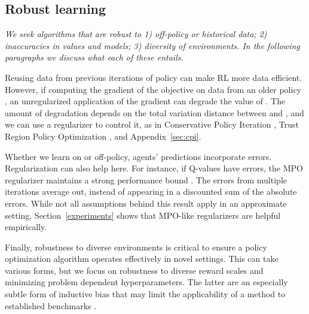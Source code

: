 \documentclass{article}
\begin{document}
\subsection{Robust learning}\label{sec:desire_robust} \textit{We seek algorithms that are robust to 1) off-policy or historical data; 2) inaccuracies in values and models; 3) diversity of environments. In the following paragraphs we discuss what each of these entails.}

Reusing data from previous iterations of policy  \citep{lin1992,riedmiller2005,mnih2015} can make RL more data efficient. However, if computing the gradient of the objective  on data from an older policy , an unregularized application of the gradient can degrade the value of . The amount of degradation depends on the total variation distance between  and , and we can use a regularizer to control it, as in Conservative Policy Iteration \cite{kakade2002approximately}, Trust Region Policy Optimization \cite{schulman2015trust}, and Appendix~\ref{sec:cpi}.

Whether we learn on or off-policy, agents' predictions incorporate errors. Regularization can also help here. For instance, if Q-values have errors, the MPO regularizer  maintains a strong performance bound \citep{vieillard2020}. The errors from multiple iterations average out, instead of appearing in a discounted sum of the absolute errors. While not all assumptions behind this result apply in an approximate setting, Section~\ref{experiments} shows that MPO-like regularizers are helpful empirically.

Finally, robustness to diverse environments is critical to ensure a policy optimization algorithm operates effectively in novel settings. This can take various forms, but we focus on robustness to diverse reward scales and minimizing problem dependent hyperparameters. The latter are an especially subtle form of inductive bias that may limit the applicability of a method to established benchmarks \cite{Hessel2019OnIB}.
\end{document}

